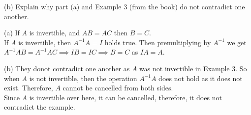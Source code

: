 \documentclass[addpoints]{exam}
\begin{document}
\begin{sloppypar}
\begin{questions}
    \hspace{7.5mm} (b) Explain why part (a) and Example 3 (from the book) do not contradict one another.
    \begin{solution}
        
        (a) If $A$ is invertible, and $ AB = AC $ then $ B = C $. \\ 
        If $A$ is invertible, then $ A^{-1}A = I $ holds true. Then premultiplying by $ A^{-1} $ we get $ A^{-1}AB = A^{-1}AC \implies IB = IC \implies B = C$ as $ IA = A $.

        (b) They donot contradict one another as $A$ was not invertible in Example 3. So when $A$ is not invertible, then the operation $ A^{-1}A $ does not hold as it does not exist. Therefore, $A$ cannot be cancelled from both sides. \\ 
        Since $A$ is invertible over here, it can be cancelled, therefore, it does not contradict the example.
    \end{solution}

\end{questions}

\end{sloppypar}
\end{document}
